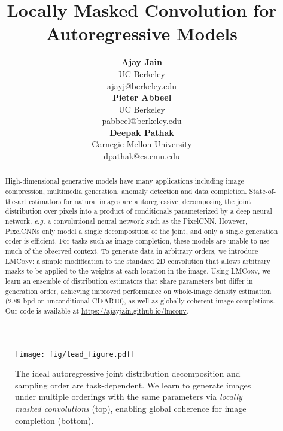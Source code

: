 \documentclass[letterpaper]{article}
\title{Locally Masked Convolution for Autoregressive Models}
\author{ {\bf Ajay Jain} \\
UC Berkeley \\
ajayj@berkeley.edu \\
\And
{\bf Pieter Abbeel} \\
UC Berkeley \\
pabbeel@berkeley.edu \\
\And
{\bf Deepak Pathak} \\
Carnegie Mellon University \\
dpathak@cs.cmu.edu \\
}
\begin{document}
\newcommand{\todo}[1]{{\color{red} TODO: #1}}
\newcommand{\ie}[0]{\textit{i.e.}}
\newcommand{\eg}[0]{\textit{e.g.}}
\newcommand{\ours}[0]{\textsc{LMConv}}

\maketitle

\begin{abstract}
High-dimensional generative models have many applications including image compression, multimedia generation, anomaly detection and data completion.
State-of-the-art estimators for natural images are autoregressive, decomposing the joint distribution over pixels into a product of conditionals parameterized by a deep neural network, \eg{} a convolutional neural network such as the PixelCNN. However, PixelCNNs only model a single decomposition of the joint, and only a single generation order is efficient. For tasks such as image completion, these models are unable to use much of the observed context. To generate data in arbitrary orders, we introduce \textsc{LMConv}: a simple modification to the standard 2D convolution that allows arbitrary masks to be applied to the weights at each location in the image. Using \textsc{LMConv}, we learn an ensemble of distribution estimators that share parameters but differ in generation order, achieving improved performance on whole-image density estimation (2.89 bpd on unconditional CIFAR10), as well as globally coherent image completions. Our code is available at {\small \url{https://ajayjain.github.io/lmconv}}.
\end{abstract}

\begin{figure}[!t]
	\centering
    \texttt{[image: fig/lead\_figure.pdf]}
    \vspace{-3mm}
	\caption{The ideal autoregressive joint distribution decomposition and sampling order are task-dependent. We learn to generate images under multiple orderings with the same parameters via \textit{locally masked convolutions} (top), enabling global coherence for image completion (bottom).}
	\label{fig:inpainting}
	\vspace{-2mm}
\end{figure}
\end{document}
